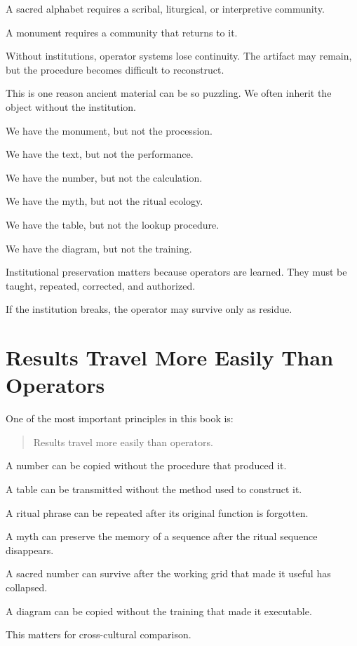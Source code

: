 \documentclass[11pt]{book}
\begin{document}
A sacred alphabet requires a scribal, liturgical, or interpretive community.

A monument requires a community that returns to it.

Without institutions, operator systems lose continuity. The artifact may remain, but the procedure becomes difficult to reconstruct.

This is one reason ancient material can be so puzzling. We often inherit the object without the institution.

We have the monument, but not the procession.

We have the text, but not the performance.

We have the number, but not the calculation.

We have the myth, but not the ritual ecology.

We have the table, but not the lookup procedure.

We have the diagram, but not the training.

Institutional preservation matters because operators are learned. They must be taught, repeated, corrected, and authorized.

If the institution breaks, the operator may survive only as residue.

\section{Results Travel More Easily Than Operators}

One of the most important principles in this book is:

\begin{quote}
Results travel more easily than operators.
\end{quote}

A number can be copied without the procedure that produced it.

A table can be transmitted without the method used to construct it.

A ritual phrase can be repeated after its original function is forgotten.

A myth can preserve the memory of a sequence after the ritual sequence disappears.

A sacred number can survive after the working grid that made it useful has collapsed.

A diagram can be copied without the training that made it executable.

This matters for cross-cultural comparison.
\end{document}
